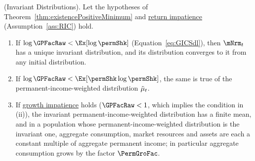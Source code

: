\documentclass[\econtexRoot/BufferStockTheory]{subfiles}
\begin{document}
\begin{proposition}(Invariant Distributions).\label{prop:invariantPositiveMinimum}
Let the hypotheses of Theorem~\ref{thm:existencePositiveMinimum} and \hyperlink{RIC}{return impatience} (Assumption~\ref{ass:RIC}) hold.
\begin{enumerate}[label=(\roman*)]
\item If $\log\GPFacRaw<\Ex[\log\permShk]$ (Equation~\eqref{eq:GICSdl}), then $\mNrm_{t}$ has a unique invariant distribution, and its distribution converges to it from any initial distribution.
\item If $\log\GPFacRaw<\Ex[\permShk\log\permShk]$, the same is true of the permanent-income-weighted distribution $\tilde{\mu}_{t}$.
\item If \hyperlink{GICRaw}{growth impatience} holds ($\GPFacRaw<1$, which implies the condition in (ii)), the invariant permanent-income-weighted distribution has a finite mean, and in a population whose permanent-income-weighted distribution is the invariant one, aggregate consumption, market resources and assets are each a constant multiple of aggregate permanent income; in particular aggregate consumption grows by the factor $\PermGroFac$.
\end{enumerate}
\end{proposition}
\end{document}
